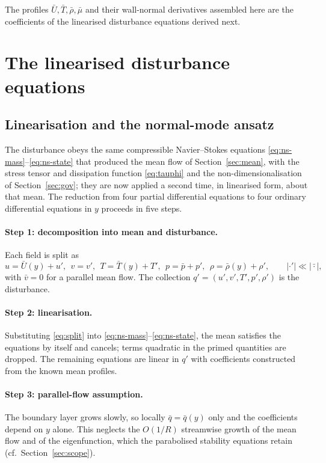 \documentclass[11pt]{article}
\begin{document}
The profiles $\bar U,\bar T,\bar\rho,\bar\mu$ and their wall-normal derivatives assembled here are
the coefficients of the linearised disturbance equations derived next.


\clearpage
\section{The linearised disturbance equations}\label{sec:disturbance}
\subsection{Linearisation and the normal-mode ansatz}\label{sec:lin}
The disturbance obeys the same compressible Navier--Stokes equations
\eqref{eq:ns-mass}--\eqref{eq:ns-state} that produced the mean flow of Section~\ref{sec:mean},
with the stress tensor and dissipation function \eqref{eq:tauphi} and the
non-dimensionalisation of Section~\ref{sec:gov}; they are now applied a second time, in
linearised form, about that mean. The reduction from four partial differential equations to
four ordinary differential equations in $y$ proceeds in five steps.

\paragraph{Step 1: decomposition into mean and disturbance.} Each field is split as
\begin{equation}\label{eq:split}
  u=\bar U(y)+u',\ \ v=v',\ \ T=\bar T(y)+T',\ \ p=\bar p+p',\ \ \rho=\bar\rho(y)+\rho',\qquad
  |\cdot'|\ll|\bar\cdot|,
\end{equation}
with $\bar v=0$ for a parallel mean flow. The collection $q'=(u',v',T',p',\rho')$ is the disturbance.

\paragraph{Step 2: linearisation.} Substituting \eqref{eq:split} into
\eqref{eq:ns-mass}--\eqref{eq:ns-state}, the mean satisfies the equations by itself and cancels; terms
quadratic in the primed quantities are dropped. The remaining equations are linear in $q'$ with
coefficients constructed from the known mean profiles.

\paragraph{Step 3: parallel-flow assumption.} The boundary layer grows slowly, so locally
$\bar q=\bar q(y)$ only and the coefficients depend on $y$ alone. This neglects the $O(1/R)$ streamwise
growth of the mean flow and of the eigenfunction, which the parabolised stability equations retain
\cite{herbert1997} (cf.\ Section~\ref{sec:scope}).
\end{document}
